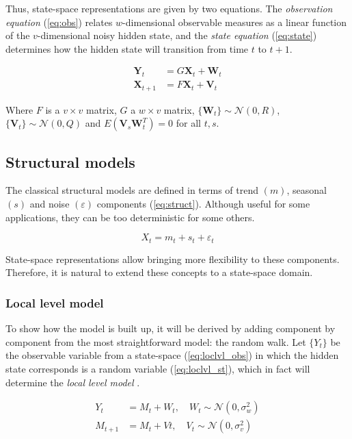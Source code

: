 Thus, state-space representations are given by two equations. The \emph{observation equation} (\ref{eq:obs}) relates $w$-dimensional observable measures as a linear function of the $v$-dimensional noisy hidden state, and the \emph{state equation} (\ref{eq:state}) determines how the hidden state will transition from time $t$ to $t+1$.

\begin{align}
	\bm{Y}_t		&=	G\bm{X}_t + \bm{W}_t  \label{eq:obs} \\
	\bm{X}_{t+1}	&=	F\bm{X}_t + \bm{V}_t \label{eq:state} 
\end{align}

Where $F$ is a $v \times v$ matrix, $G$ a $w \times v$ matrix, $\{\bm{W}_t\} \sim \mathcal{N}(0,R)$, $\{\bm{V}_t\} \sim \mathcal{N}(0,Q)$ and $E(\bm{V}_s\bm{W}^T_t) = 0$ for all $t, s$.

\subsection{Structural models}

The classical structural models are defined in terms of trend $(m)$, seasonal $(s)$ and noise $(\varepsilon)$ components (\ref{eq:struct}). Although useful for some applications, they can be too deterministic for some others.

\begin{equation}\label{eq:struct}
	X_t = m_t + s_t + \varepsilon_t
\end{equation}

State-space representations allow bringing more flexibility to these components. Therefore, it is natural to extend these concepts to a state-space domain. 

\subsubsection{Local level model}

To show how the model is built up, it will be derived by adding component by component from the most straightforward model: the random walk. Let $\{Y_t\}$ be the observable variable from a state-space (\ref{eq:loclvl_obs}) in which the hidden state corresponds is a random variable (\ref{eq:loclvl_st}), which in fact will determine the \emph{local level model} \cite{brockwell2016introduction}.

\begin{align}
	Y_t		&= M_t + W_t, \quad W_t \sim \mathcal{N}(0,\sigma^2_w) \label{eq:loclvl_obs} \\
	M_{t+1}	&= M_t + Vt, \quad V_t \sim \mathcal{N}(0,\sigma^2_v) \label{eq:loclvl_st}
\end{align}

